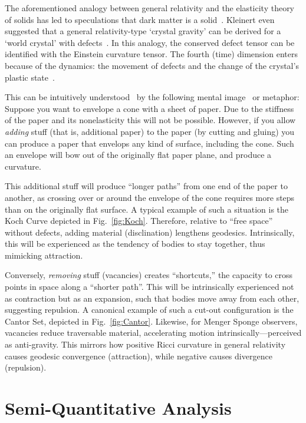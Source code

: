 \documentclass[%
  reprint,
  superscriptaddress,
  showpacs,
  showkeys,
  amsmath,amssymb,
  pra,
  longbibliography,
  floatfix,
]{revtex4-2}
\begin{document}
The aforementioned analogy between general relativity and the elasticity theory of solids
has led to speculations that dark matter is a solid~\cite{Bucher-PhysRevD.60.043505}.
Kleinert even suggested that a general relativity-type `crystal gravity' can be derived for a `world crystal' with defects~\cite{kleinert-1987,kleinert-2000,kroner-2001,kleinert-2004}.
In this analogy, the conserved defect tensor can be identified with the Einstein curvature tensor.
The fourth (time) dimension enters because of the dynamics: the movement of defects and the change of the crystal's plastic state~\cite{amari-1968}.

This can be intuitively understood~\cite{zaanen-2022} by the following mental image~\cite{hertz-94e} or metaphor:
Suppose you want to envelope a cone with a sheet of paper.
Due to the stiffness of the paper and its nonelasticity this will not be possible.
However, if you allow \emph{adding} stuff (that is, additional paper) to the paper (by cutting and gluing) you can
produce a paper that envelops any kind of surface, including the cone. Such an envelope will bow out of the originally flat
paper plane, and produce a curvature.

This additional stuff will produce  ``longer paths'' from one end of the paper to another,
as crossing over or around the envelope of the cone requires more steps than on the originally flat surface.
A typical example of such a situation is the Koch Curve depicted in Fig.~\ref{fig:Koch}.
Therefore, relative to ``free space'' without defects, adding material (disclination) lengthens geodesics.
Intrinsically, this will be experienced as the tendency of bodies to stay together, thus mimicking attraction.

Conversely, \emph{removing} stuff (vacancies) creates ``shortcuts,'' the capacity to cross points in space
along a ``shorter path''. This will be intrinsically experienced not as contraction but as an expansion,
such that bodies move away from each other, suggesting repulsion.
A canonical example of such a cut-out configuration is the Cantor Set, depicted in Fig.~\ref{fig:Cantor}.
Likewise, for Menger Sponge observers, vacancies reduce traversable material, accelerating motion intrinsically---perceived as anti-gravity.
This mirrors how positive Ricci curvature in general relativity causes geodesic convergence (attraction), while negative causes divergence (repulsion).

\section{Semi-Quantitative Analysis}
\label{sec:quant}
\end{document}
